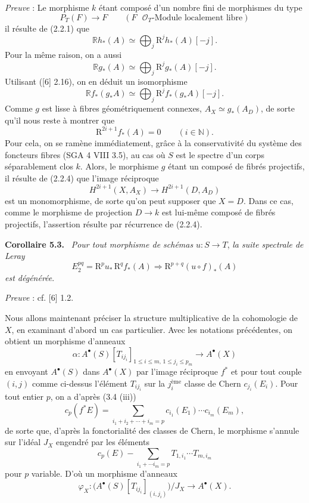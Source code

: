 \documentclass[11pt]{article}
\newenvironment{statement}[1]{\par\medskip\noindent\textbf{#1.}\ }{\par\medskip}
\newcommand{\R}{\mathbb{R}}\newcommand{\RHomCore}{\mathbb{R}\mathrm{Hom}}
\providecommand{\R}{\mathrm R}
\begin{document}
\emph{Preuve} : Le morphisme $k$ étant composé d'un nombre fini de morphismes du type
\[
P_T(F)\to F\qquad (F\text{ }\mathcal O_T\text{-Module localement libre})
\tag{Q}
\]
il résulte de (2.2.1) que
\[
\R h_*(A)\simeq\bigoplus_j \mathrm{R}^jh_*(A)[-j].
\]
Pour la même raison, on a aussi
\[
\R g_*(A)\simeq\bigoplus_j \mathrm{R}^jg_*(A)[-j].
\]
Utilisant ([6] 2.16), on en déduit un isomorphisme
\[
\R f_*(g_*A)\simeq\bigoplus_j \mathrm{R}^j f_*(g_*A)[-j].
\]
Comme $g$ est lisse à fibres géométriquement connexes, $A_X\simeq g_*(A_D)$, de sorte qu'il nous reste à montrer que
\[
\mathrm{R}^{2i+1}f_*(A)=0\qquad (i\in\mathbb N).
\tag{5.2.1}
\]
Pour cela, on se ramène immédiatement, grâce à la conservativité du système des foncteurs fibres (SGA 4 VIII 3.5), au cas où $S$ est le spectre d'un corps séparablement clos $k$. Alors, le morphisme $g$ étant un composé de fibrés projectifs, il résulte de (2.2.4) que l'image réciproque
\[
H^{2i+1}(X,A_X)\to H^{2i+1}(D,A_D)
\]
est un monomorphisme, de sorte qu'on peut supposer que $X=D$. Dans ce cas, comme le
morphisme de projection $D\to k$ est lui-même composé de fibrés projectifs, l'assertion résulte par récurrence de (2.2.4).

\begin{statement}{Corollaire 5.3}
\emph{Pour tout morphisme de schémas} $u:S\to T$, \emph{la suite spectrale de Leray}
\[
E_2^{pq}=\mathrm{R}^p u_*\,\mathrm{R}^q f_*(A)\Rightarrow \mathrm{R}^{p+q}(u\circ f)_*(A)
\]
\emph{est dégénérée}.
\end{statement}

\emph{Preuve} : cf. [6] 1.2.

Nous allons maintenant préciser la structure multiplicative de la cohomologie de $X$, en examinant d'abord un cas particulier. Avec les notations précédentes, on obtient un morphisme d'anneaux
\[
\alpha:A^{\bullet}(S)[T_{ij_i}]_{1\le i\le m,\,1\le j_i\le p_m}\to A^{\bullet}(X)
\]
en envoyant $A^{\bullet}(S)$ dans $A^{\bullet}(X)$ par l'image réciproque $f^*$ et pour tout couple $(i,j)$ comme ci-dessus l'élément $T_{ij_i}$ sur la $j_i^{\text{ème}}$ classe de Chern $c_{j_i}(E_i)$. Pour tout entier $p$, on a d'après (3.4 (iii))
\[
c_p(f^*E)=\sum_{i_1+i_2+\cdots+i_m=p}c_{i_1}(E_1)\cdots c_{i_m}(E_m),
\]
de sorte que, d'après la fonctorialité des classes de Chern, le morphisme s'annule sur l'idéal $J_X$ engendré par les éléments
\[
c_p(E)-\sum_{i_1+\cdots i_m=p}T_{1,i_1}\cdots T_{m,i_m}
\]
pour $p$ variable. D'où un morphisme d'anneaux
\[
\varphi_X:\bigl(A^{\bullet}(S)[T_{ij_i}]_{(i,j_i)}\bigr)/J_X\to A^{\bullet}(X).
\]
\end{document}
